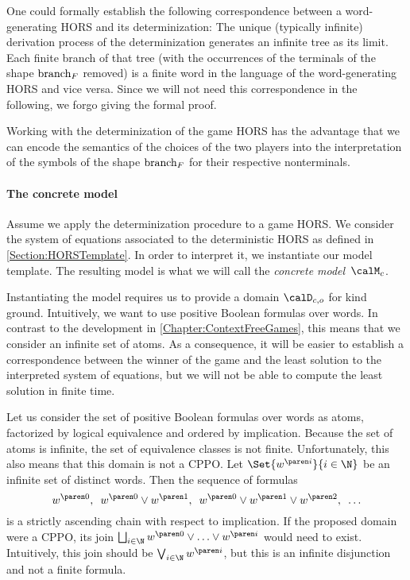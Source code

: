 \documentclass[../../diss.tex]{subfiles}
\begin{document}
One could formally establish the following correspondence between a word-generating HORS and its determinization:
The unique (typically infinite) derivation process of the determinization generates an infinite tree as its limit.
Each finite branch of that tree (with the occurrences of the terminals of the shape $\text{branch}_F$ removed) is a finite word in the language of the word-generating HORS and vice versa.
Since we will not need this correspondence in the following, we forgo giving the formal proof.

Working with the determinization of the game HORS has the advantage that we can encode the semantics of the choices of the two  players into the interpretation of the symbols of the shape $\text{branch}_F$ for their respective nonterminals.

\paragraph{The concrete model}

Assume we apply the determinization procedure to a game HORS.\@
We consider the system of equations associated to the deterministic HORS as defined in \cref{Section:HORSTemplate}.
In order to interpret it, we instantiate our model template.
The resulting model is what we will call the \emph{concrete model}~$\modelc$.

Instantiating the model requires us to provide a domain $\domainc{\ground}$ for kind ground.
Intuitively, we want to use positive Boolean formulas over words.
In contrast to the development in \cref{Chapter:ContextFreeGames}, this means that we consider an infinite set of atoms.
As a consequence, it will be easier to establish a correspondence between the winner of the game and the least solution to the interpreted system of equations, but we will not be able to compute the least solution in finite time.

Let us consider the set of positive Boolean formulas over words as atoms, factorized by logical equivalence and ordered by implication.
Because the set of atoms is infinite, the set of equivalence classes is not finite.
Unfortunately, this also means that this domain is not a CPPO.\@
Let $\Set{ \itr{w}{i} }{i \in \N}$ be an infinite set of distinct words.
Then the sequence of formulas
\[
    \itr{w}{0},
    \enspace
    \itr{w}{0} \vee \itr{w}{1},
    \enspace
    \itr{w}{0} \vee \itr{w}{1} \vee \itr{w}{2},
    \enspace
    \ldots
\]
is a strictly ascending chain with respect to implication.
If the proposed domain were a CPPO, its join $\bigsqcup_{i \in \N} \itr{w}{0} \vee \ldots \vee \itr{w}{i}$ would need to exist.
Intuitively, this join should be $\bigvee_{i \in \N} \itr{w}{i}$, but this is an infinite disjunction and not a finite formula.
\end{document}
